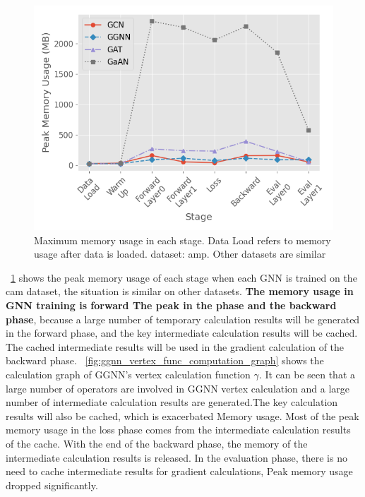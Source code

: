 \begin{figure}
    \centering
    \includegraphics[width=0.7\columnwidth]{figs/experiments/exp_memory_usage_stage_amp.png}
    \caption{Maximum memory usage in each stage. Data Load refers to memory usage after data is loaded. dataset: amp. Other datasets are similar}
    \label{fig:exp_memory_usage_stage_amp}
\end{figure}

\figurename~\ref{fig:exp_memory_usage_stage_amp} shows the peak memory usage of each stage when each GNN is trained on the cam dataset, the situation is similar on other datasets.
\textbf{The memory usage in GNN training is forward The peak in the phase and the backward phase}, 
because a large number of temporary calculation results will be generated in the forward phase,
and the key intermediate calculation results will be cached.
The cached intermediate results will be used in the gradient calculation of the backward phase.
\figurename~\ref{fig:ggnn_vertex_func_computation_graph} shows the calculation graph of GGNN's vertex calculation function $\gamma$.
It can be seen that a large number of operators are involved in GGNN vertex calculation and a large number of intermediate calculation results are generated.The key calculation results will also be cached,
which is exacerbated Memory usage. Most of the peak memory usage in the loss phase comes from the intermediate calculation results of the cache.
With the end of the backward phase, the memory of the intermediate calculation results is released.
In the evaluation phase, there is no need to cache intermediate results for gradient calculations, Peak memory usage dropped significantly.


